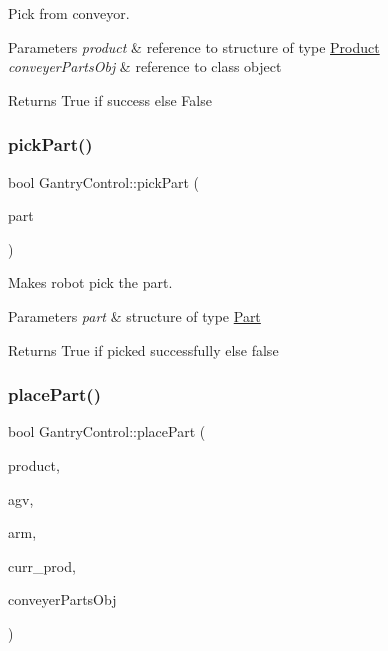 Pick from conveyor. 


\begin{DoxyParams}{Parameters}
{\em product} & reference to structure of type \hyperlink{structProduct}{Product} \\
\hline
{\em conveyer\+Parts\+Obj} & reference to class object \\
\hline
\end{DoxyParams}
\begin{DoxyReturn}{Returns}
True if success else False 
\end{DoxyReturn}
\mbox{\label{classGantryControl_a123e820d39664f98c9417a7ed310f1f3}} 
\subsubsection{\texorpdfstring{pick\+Part()}{pickPart()}}
{\footnotesize\ttfamily bool Gantry\+Control\+::pick\+Part (\begin{DoxyParamCaption}\item[{\hyperlink{structPart}{Part}}]{part }\end{DoxyParamCaption})}



Makes robot pick the part. 


\begin{DoxyParams}{Parameters}
{\em part} & structure of type \hyperlink{structPart}{Part} \\
\hline
\end{DoxyParams}
\begin{DoxyReturn}{Returns}
True if picked successfully else false 
\end{DoxyReturn}
\mbox{\label{classGantryControl_a68b77a45d3daee67f600571a52ed9ac2}} 
\subsubsection{\texorpdfstring{place\+Part()}{placePart()}}
{\footnotesize\ttfamily bool Gantry\+Control\+::place\+Part (\begin{DoxyParamCaption}\item[{\hyperlink{structProduct}{Product} \&}]{product,  }\item[{std\+::string}]{agv,  }\item[{std\+::string}]{arm,  }\item[{struct \hyperlink{structall__Order}{all\+\_\+\+Order} $\ast$}]{curr\+\_\+prod,  }\item[{\hyperlink{classConveyerParts}{Conveyer\+Parts} \&}]{conveyer\+Parts\+Obj }\end{DoxyParamCaption})}



